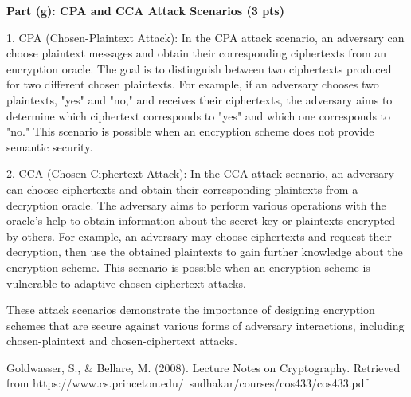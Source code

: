 \documentclass{article}
\begin{document}
\textbf{Part (g): CPA and CCA Attack Scenarios (3 pts)}

1. CPA (Chosen-Plaintext Attack): In the CPA attack scenario, an adversary can choose plaintext messages and obtain their corresponding ciphertexts from an encryption oracle. The goal is to distinguish between two ciphertexts produced for two different chosen plaintexts. For example, if an adversary chooses two plaintexts, "yes" and "no," and receives their ciphertexts, the adversary aims to determine which ciphertext corresponds to "yes" and which one corresponds to "no." This scenario is possible when an encryption scheme does not provide semantic security.

2. CCA (Chosen-Ciphertext Attack): In the CCA attack scenario, an adversary can choose ciphertexts and obtain their corresponding plaintexts from a decryption oracle. The adversary aims to perform various operations with the oracle's help to obtain information about the secret key or plaintexts encrypted by others. For example, an adversary may choose ciphertexts and request their decryption, then use the obtained plaintexts to gain further knowledge about the encryption scheme. This scenario is possible when an encryption scheme is vulnerable to adaptive chosen-ciphertext attacks.

These attack scenarios demonstrate the importance of designing encryption schemes that are secure against various forms of adversary interactions, including chosen-plaintext and chosen-ciphertext attacks.

\begin{thebibliography}{9}
     Goldwasser, S., & Bellare, M. (2008). Lecture Notes on Cryptography. Retrieved from https://www.cs.princeton.edu/~sudhakar/courses/cos433/cos433.pdf
\end{thebibliography}
\end{document}
